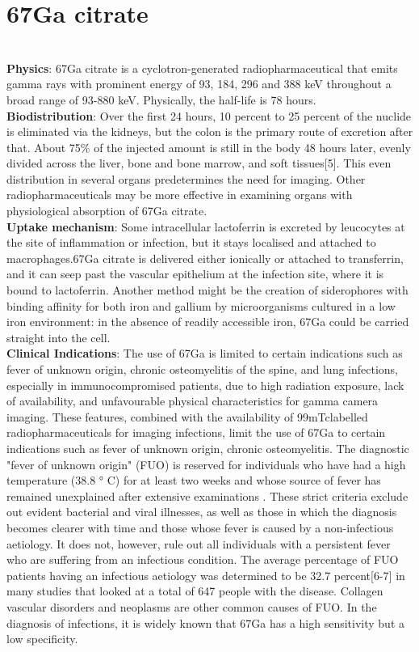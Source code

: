 \documentclass[12pt]{article}
\begin{document}
\section*{67Ga citrate}
\\\textbf{Physics}: 67Ga citrate is a cyclotron-generated radiopharmaceutical that emits gamma rays with prominent energy of 93, 184, 296 and 388 keV throughout a broad range of 93-880 keV. Physically, the half-life is 78 hours.
\\\textbf{Biodistribution}: Over the first 24 hours, 10 percent to 25 percent of the nuclide is eliminated via the kidneys, but the colon is the primary route of excretion after that. About 75$\%$ of the injected amount is still in the body 48 hours later, evenly divided across the liver, bone and bone marrow, and soft tissues[5]. This even distribution in several organs predetermines the need for imaging. Other radiopharmaceuticals may be more effective in examining organs with physiological absorption of 67Ga citrate.
\\\textbf{Uptake mechanism}: Some intracellular lactoferrin is excreted by leucocytes at the site of inflammation or infection, but it stays localised and attached to macrophages.67Ga citrate is delivered either ionically or attached to transferrin, and it can seep past the vascular epithelium at the infection site, where it is bound to lactoferrin. Another method might be the creation of siderophores with binding affinity for both iron and gallium by microorganisms cultured in a low iron environment: in the absence of readily accessible iron, 67Ga could be carried straight into the cell.
\\\textbf{Clinical Indications}: The use of 67Ga is limited to certain indications such as fever of unknown origin, chronic osteomyelitis of the spine, and lung infections, especially in immunocompromised patients, due to high radiation exposure, lack of availability, and unfavourable physical characteristics for gamma camera imaging. These features, combined with the availability of 99mTclabelled radiopharmaceuticals for imaging infections, limit the use of 67Ga to certain indications such as fever of unknown origin, chronic osteomyelitis. The diagnostic "fever of unknown origin" (FUO) is reserved for individuals who have had a high temperature (38.8 ° C) for at least two weeks and whose source of fever has remained unexplained after extensive examinations . These strict criteria exclude out evident bacterial and viral illnesses, as well as those in which the diagnosis becomes clearer with time and those whose fever is caused by a non-infectious aetiology. It does not, however, rule out all individuals with a persistent fever who are suffering from an infectious condition. The average percentage of FUO patients having an infectious aetiology was determined to be 32.7 percent[6-7] in many studies that looked at a total of 647 people with the disease. Collagen vascular disorders and neoplasms are other common causes of FUO. In the diagnosis of infections, it is widely known that 67Ga has a high sensitivity but a low specificity.
\end{document}
